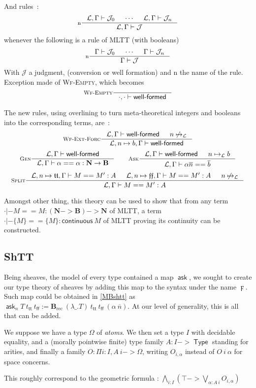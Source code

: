 \documentclass[11pt]{article}
\DeclareMathOperator{\Type}{\mathsf{Type}}
\DeclareMathOperator{\ask}{\mathsf{ask}}
\DeclareMathOperator{\rec}{rec}
\DeclareMathOperator{\true}{\mathsf{tt}}
\DeclareMathOperator{\false}{\mathsf{ff}}
\DeclareMathOperator{\mtrue}{\mathfrak{tt}}
\DeclareMathOperator{\mfalse}{\mathfrak{ff}}
\newcommand{\ovl}{\overline}
\newcommand{\0}{\mathbf{0}}
\newcommand{\1}{\mathbf{1}}
\newcommand{\nat}{\mathbf{N}}
\newcommand{\bool}{\mathbf{B}}
\newcommand{\tctx}{\Gamma}
\newcommand{\Wf}{\textsf{well-formed}}
\newcommand{\fctx}{\mathcal{L}}
\begin{document}
And rules~:
$$
    \inference[n]{\fctx,\tctx |- \mathcal{J}_0 & \cdots & \fctx,\tctx |- \mathcal{J}_n}{\fctx,\tctx |- \mathcal{J}}
$$
whenever the following is a rule of MLTT (with booleans)
$$
    \inference[n]{\tctx |- \mathcal{J}_0 & \cdots & \tctx |- \mathcal{J}_n}{\tctx |- \mathcal{J}}
$$
With $\mathcal{J}$ a judgment, (conversion or well formation) and $\text{n}$ the name of the rule.
Exception made of \textsc{Wf-Empty}, which becomes
$$
    \inference[\textsc{Wf-Empty}]{}{\cdot,\cdot |- \Wf}
$$

The new rules, using overlining to turn meta-theoretical integers and booleans into the corresponding terms, are~:
$$
    \inference[\textsc{Wf-Ext-Forc}]{\fctx,\tctx |- \Wf & n\not\mapsto_\fctx}{\fctx, n\mapsto b, \tctx |- \Wf}
$$
$$
    \inference[\textsc{Gen}]{\fctx,\tctx|- \Wf}{\fctx,\tctx |- \alpha == \alpha : \nat -> \bool}
    \qquad
    \inference[\textsc{Ask}]{\fctx,\tctx|- \Wf &n\mapsto_\fctx b}{\fctx, \tctx |- \alpha \ovl n == \ovl b}
$$
$$
    \inference[\textsc{Split}]{\fctx,n\mapsto \mtrue,\tctx |-M == M' :A & \fctx, n\mapsto\mfalse, \tctx |- M == M' : A & n\not\mapsto_\fctx}{\fctx,\tctx |- M == M' : A}
$$

Amongst other thing, this theory can be used to show that from any term $\cdot |- M == M : (\nat -> \bool) -> \nat$ of MLTT, a term $\cdot |- \{M\} == \{M\} : \mathsf{continuous}\ M$ of MLTT proving its continuity can be constructed.

\subsection{ShTT}

Being sheaves, the model of every type contained a map $\ask$, we sought to create our type theory of sheaves by adding this map to the syntax under the name $\digamma$. Such map could be obtained in \ref{MBshtt} as $\ask_n T\ t_{\true}\ t_{\false} := \bool_{\rec}\ (\lambda\_.T)\  t_{\true}\ t_{\false}\ (\alpha\ \ovl{n})$. At our level of generality, this is all that can be added.

We suppose we have a type $\Omega$ of \emph{atoms}.
We then set a type $I$ with decidable equality, and a (morally pointwise finite) type family $A : I -> \Type$ standing for arities, and finally a family $O : \Pi i:I, A\ i -> \Omega$, writing $O_{i,\alpha}$ instead of $O\ i\ \alpha$ for space concerns.

This roughly correspond to the geometric formula : 
$\bigwedge\limits_{i : I} \left(\top -> \bigvee\limits_{\alpha : A\ i}O_{i,\alpha}\right)$
\end{document}

